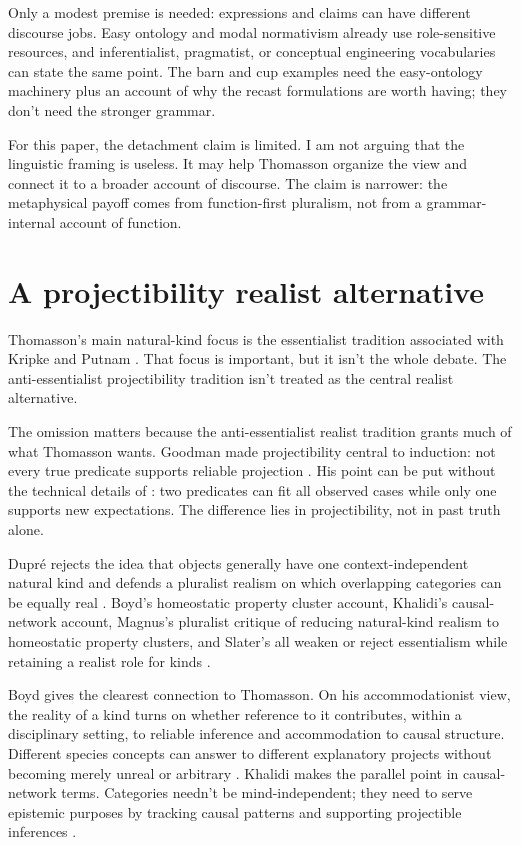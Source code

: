 \documentclass[12pt]{article}
\begin{document}
Only a modest premise is needed: expressions and claims can have different discourse jobs. Easy ontology and modal normativism already use role-sensitive resources, and inferentialist, pragmatist, or conceptual engineering vocabularies can state the same point. The barn and cup examples need the easy-ontology machinery plus an account of why the recast formulations are worth having; they don't need the stronger grammar.

For this paper, the detachment claim is limited. I am not arguing that the linguistic framing is useless. It may help Thomasson organize the view and connect it to a broader account of discourse. The claim is narrower: the metaphysical payoff comes from function-first pluralism, not from a grammar-internal account of function.

\section{A projectibility realist alternative}

Thomasson's main natural-kind focus is the essentialist tradition associated with Kripke and Putnam \citep{Kripke1980,Putnam1975Meaning}. That focus is important, but it isn't the whole debate. The anti-essentialist projectibility tradition isn't treated as the central realist alternative.

The omission matters because the anti-essentialist realist tradition grants much of what Thomasson wants. Goodman made projectibility central to induction: not every true predicate supports reliable projection \citep{Goodman1955}. His point can be put without the technical details of : two predicates can fit all observed cases while only one supports new expectations. The difference lies in projectibility, not in past truth alone.

Dupré rejects the idea that objects generally have one context-independent natural kind and defends a pluralist realism on which overlapping categories can be equally real \citep[5--7, 57--58, 262]{dupre1993disorder}. Boyd's homeostatic property cluster account, Khalidi's causal-network account, Magnus's pluralist critique of reducing natural-kind realism to homeostatic property clusters, and Slater's  all weaken or reject essentialism while retaining a realist role for kinds \citep{boyd1991,boyd1999,khalidi2013,khalidi2018nodes,magnus2012scientific,slater2015}.

Boyd gives the clearest connection to Thomasson. On his accommodationist view, the reality of a kind turns on whether reference to it contributes, within a disciplinary setting, to reliable inference and accommodation to causal structure. Different species concepts can answer to different explanatory projects without becoming merely unreal or arbitrary \citep[169--176]{boyd1999}. Khalidi makes the parallel point in causal-network terms. Categories needn't be mind-independent; they need to serve epistemic purposes by tracking causal patterns and supporting projectible inferences \citep[202--203]{khalidi2013}.
\end{document}
